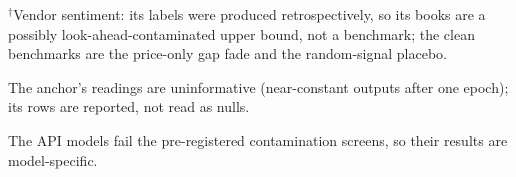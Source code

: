 \begin{landscape}
{$^{\dagger}$Vendor sentiment: its labels were produced retrospectively, so its books are a possibly look-ahead-contaminated upper bound, not a benchmark; the clean benchmarks are the price-only gap fade and the random-signal placebo.\par
The anchor's readings are uninformative (near-constant outputs after one epoch); its rows are reported, not read as nulls.\par
The API models fail the pre-registered contamination screens, so their results are model-specific.\par
}
\end{landscape}
